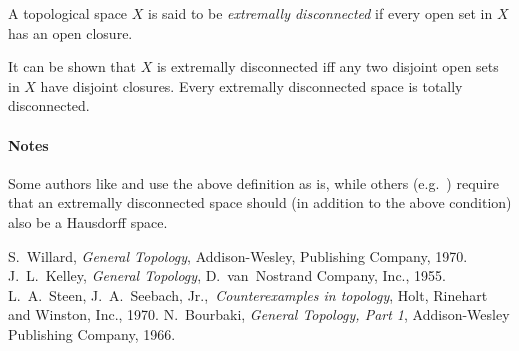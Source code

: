 \documentclass[12pt]{article}
\begin{document}
A topological space $X$ is said to be {\em extremally disconnected} if every open set in $X$ has an open closure.

It can be shown that $X$ is extremally disconnected iff any two disjoint open sets in $X$ have disjoint closures. Every extremally disconnected space is totally disconnected.

\paragraph{Notes}
Some authors like \cite{willard} and \cite{kelley} use the above
definition as is, while others (e.g.~\cite{steen, bourbaki}) require
that an extremally disconnected space should (in addition to the above
condition) also be a Hausdorff space. 

\begin{thebibliography}{9}
 S.~Willard, \emph{General Topology},
Addison-Wesley, Publishing Company, 1970.
 J.~L.~Kelley, \emph{General Topology}, 
D.~van~Nostrand Company, Inc., 1955.
 L.~A.~Steen, J.~A.~Seebach, Jr.,\
\emph{Counterexamples in topology},
Holt, Rinehart and Winston, Inc., 1970.
 N.~Bourbaki, \emph{General Topology, Part 1},
Addison-Wesley Publishing Company, 1966.
\end{thebibliography}
\end{document}
